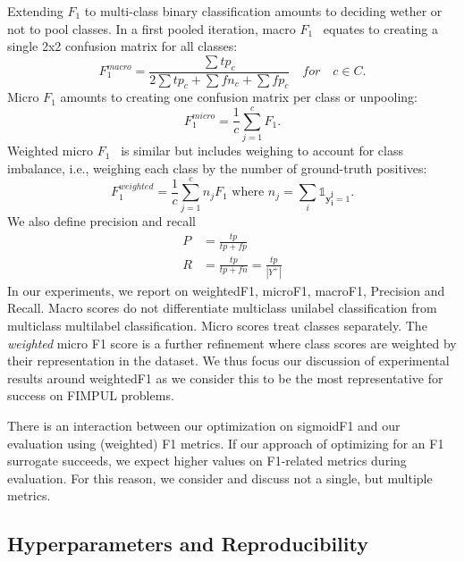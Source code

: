 Extending \(F_1\) to multi-class binary classification amounts to deciding wether or not to pool classes.
In a first pooled iteration, macro \(F_1\)~\cite{multilabelMetrics} equates to creating a single 2x2 confusion matrix for all classes:
\begin{equation}
F_1^{macro} = \frac{\sum tp_c}{2 \sum tp_c + \sum fn_c + \sum fp_c} \quad for \quad c \in C.
\end{equation}
Micro \(F_1\) \cite{threshForF1, multilabelMetrics} amounts to creating one confusion matrix per class or unpooling:
\begin{equation}
F_1^{micro} = \frac{1}{c} \sum_{j=1}^c F_1.
\end{equation}
Weighted micro \(F_1\)~\cite{weightedMetrics} is similar but includes weighing to account for class imbalance, i.e., weighing each class by the number of ground-truth positives:
\begin{equation}
F_1^{weighted} = \frac{1}{c} \sum_{j=1}^c n_j F_1 \text{ where } n_j = \sum_i \mathds{1}_{\mathbf{y_i^j} = 1}.
\end{equation}
%
We also define precision and recall
%
\begin{equation}
\begin{aligned} P &=\frac{t p}{t p+f p} \\ R &=\frac{t p}{t p+f n}=\frac{t p}{\left|Y^{+}\right|} \end{aligned}
\end{equation}
%
In our experiments, we report on weightedF1, microF1, macroF1, Precision and Recall. Macro scores do not differentiate multiclass unilabel classification from multiclass multilabel classification. Micro scores treat classes separately. The \emph{weighted} micro F1 score is a further refinement where class scores are weighted by their representation in the dataset. We thus focus our discussion of experimental results around weightedF1 as we consider this to be the most representative for success on FIMPUL problems. 

There is an interaction between our optimization on sigmoidF1 and our evaluation using (weighted) F1 metrics. If our approach of optimizing for an F1 surrogate succeeds, we expect higher values on F1-related metrics during evaluation. For this reason, we consider and discuss not a single, but multiple metrics.

\subsection{Hyperparameters and Reproducibility}

